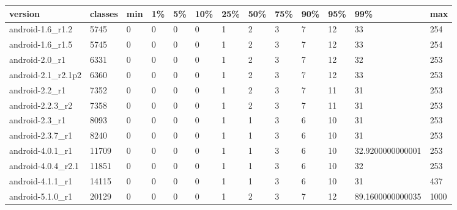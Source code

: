 \begin{tabular}{|l|l|l|l|l|l|l|l|l|l|l|l|l|}
\hline
version&classes&min&1\%&5\%&10\%&25\%&50\%&75\%&90\%&95\%&99\%&max\\
\hline
android-1.6\_r1.2&5745&0&0&0&0&1&2&3&7&12&33&254\\
\hline
android-1.6\_r1.5&5745&0&0&0&0&1&2&3&7&12&33&254\\
\hline
android-2.0\_r1&6331&0&0&0&0&1&2&3&7&12&32&253\\
\hline
android-2.1\_r2.1p2&6360&0&0&0&0&1&2&3&7&12&33&253\\
\hline
android-2.2\_r1&7352&0&0&0&0&1&2&3&7&11&31&253\\
\hline
android-2.2.3\_r2&7358&0&0&0&0&1&2&3&7&11&31&253\\
\hline
android-2.3\_r1&8093&0&0&0&0&1&1&3&6&10&31&253\\
\hline
android-2.3.7\_r1&8240&0&0&0&0&1&1&3&6&10&31&253\\
\hline
android-4.0.1\_r1&11709&0&0&0&0&1&1&3&6&10&32.9200000000001&253\\
\hline
android-4.0.4\_r2.1&11851&0&0&0&0&1&1&3&6&10&32&253\\
\hline
android-4.1.1\_r1&14115&0&0&0&0&1&1&3&6&10&31&437\\
\hline
android-5.1.0\_r1&20129&0&0&0&0&1&2&3&7&12&89.1600000000035&1000\\
\hline
\end{tabular}
